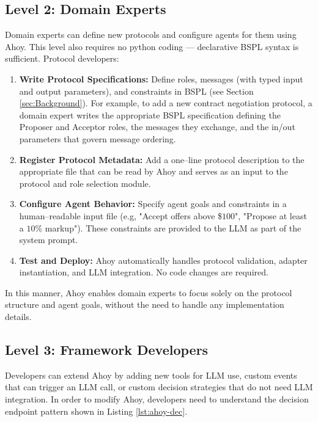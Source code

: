 \documentclass[runningheads]{llncs}
\newcommand{\ahoy}{Ahoy\xspace}
\begin{document}
\subsection{Level 2: Domain Experts}
Domain experts can define new protocols and configure agents for them using \ahoy.
This level also requires no python coding --- declarative BSPL syntax is sufficient.
Protocol developers:
\begin{enumerate}
    \item \textbf{Write Protocol Specifications:} Define roles, messages (with typed input and output parameters), and constraints in BSPL (see Section \ref{sec:Background}). For example, to add a new contract negotiation protocol, a domain expert writes the appropriate BSPL specification defining the Proposer and Acceptor roles, the messages they exchange, and the in/out parameters that govern message ordering.
    \item \textbf{Register Protocol Metadata:} Add a one--line protocol description to the appropriate file that can be read by \ahoy and serves as an input to the protocol and role selection module.
    \item \textbf{Configure Agent Behavior:} Specify agent goals and constraints in a human--readable input file (e.g, "Accept offers above \$$100$", "Propose at least a $10\%$ markup"). These constraints are provided to the LLM as part of the system prompt.
    \item \textbf{Test and Deploy:} \ahoy automatically handles protocol validation, adapter instantiation, and LLM integration. No code changes are required.
\end{enumerate}
In this manner, \ahoy enables domain experts to focus solely on the protocol structure and agent goals, without the need to handle any implementation details.

\subsection{Level 3: Framework Developers}
Developers can extend \ahoy by adding new tools for LLM use, custom events that can trigger an LLM call, or custom decision strategies that do not need LLM integration.
In order to modify \ahoy, developers need to understand the decision endpoint pattern shown in Listing \ref{lst:ahoy-dec}.
\end{document}

